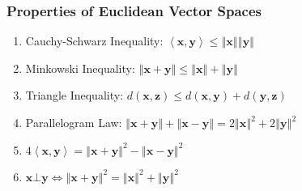 \documentclass[10pt,twoside,twocolumn]{article}
\begin{document}
\subsubsection{Properties of Euclidean Vector Spaces}
\begin{enumerate}
\item Cauchy-Schwarz Inequality: $\left\langle \mathbf{x},\mathbf{y}\right\rangle \leq\left\Vert \mathbf{x}\right\Vert \left\Vert \mathbf{y}\right\Vert $ 
\item Minkowski Inequality: $\left\Vert \mathbf{x}+\mathbf{y}\right\Vert \leq\left\Vert \mathbf{x}\right\Vert +\left\Vert \mathbf{y}\right\Vert $ 
\item Triangle Inequality: $d\left(\mathbf{x},\mathbf{z}\right)\leq d\left(\mathbf{x},\mathbf{y}\right)+d\left(\mathbf{y},\mathbf{z}\right)$ 
\item Parallelogram Law: $\left\Vert \mathbf{x}+\mathbf{y}\right\Vert +\left\Vert \mathbf{x}-\mathbf{y}\right\Vert =2\left\Vert \mathbf{x}\right\Vert ^{2}+2\left\Vert \mathbf{y}\right\Vert ^{2}$ 
\item $4\left\langle \mathbf{x},\mathbf{y}\right\rangle =\left\Vert \mathbf{x}+\mathbf{y}\right\Vert ^{2}-\left\Vert \mathbf{x}-\mathbf{y}\right\Vert ^{2}$ 
\item $\mathbf{x}\bot\mathbf{y}\iff\left\Vert \mathbf{x}+\mathbf{y}\right\Vert ^{2}=\left\Vert \mathbf{x}\right\Vert ^{2}+\left\Vert \mathbf{y}\right\Vert ^{2}$ \end{enumerate}
\end{document}

